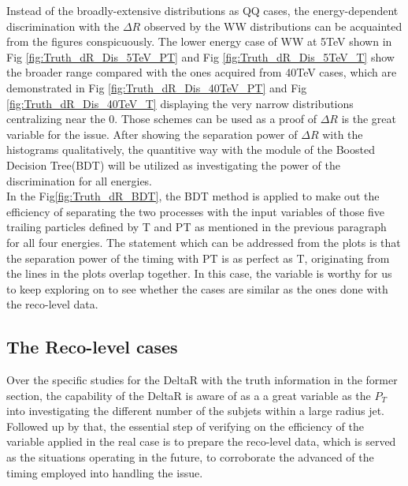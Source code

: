 Instead of the broadly-extensive distributions as QQ cases, the energy-dependent discrimination with the $\Delta R$ observed by the WW distributions can be acquainted from the figures conspicuously. The lower energy case of WW at 5TeV shown in Fig \ref{fig:Truth_dR_Dis_5TeV_PT} and Fig \ref{fig:Truth_dR_Dis_5TeV_T} show the broader range compared with the ones acquired from 40TeV cases, which are demonstrated in Fig \ref{fig:Truth_dR_Dis_40TeV_PT} and Fig \ref{fig:Truth_dR_Dis_40TeV_T} displaying the very narrow distributions centralizing near the 0. Those schemes can be used as a proof of $\Delta R$ is the great variable for the issue. After showing the separation power of $\Delta R$ with the histograms qualitatively, the quantitive way with the module of the Boosted Decision Tree(BDT) will be utilized as investigating the power of the discrimination for all energies.\\


In the Fig\ref{fig:Truth_dR_BDT}, the BDT method is applied to make out the efficiency of separating the two processes with the input variables of those five trailing particles defined by T and PT as mentioned in the previous paragraph for all four energies. The statement which can be addressed from the plots is that the separation power of the timing with PT is as perfect as T, originating from the lines in the plots overlap together. In this case, the variable is worthy for us to keep exploring on to see whether the cases are similar as the ones done with the reco-level data.\\



\subsection{The Reco-level cases}
Over the specific studies for the DeltaR with the truth information in the former section, the capability of the DeltaR is aware of as a a great variable as the $P_{T}$ into investigating the different number of the subjets within a large radius jet. Followed up by that, the essential step of verifying on the efficiency of the variable applied in the real case is to prepare the reco-level data, which is served as the situations operating in the future, to corroborate the advanced of the timing employed into handling the issue.\\ 

